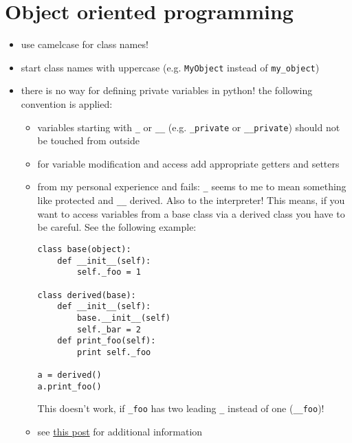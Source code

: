 \documentclass[10pt,a4paper]{scrartcl}
\begin{document}
\section{Object oriented programming}
\begin{itemize}
\item use camelcase for class names!
\item start class names with uppercase (e.g. \verb+MyObject+ instead of \verb+my_object+)
\item there is no way for defining private variables in python! the following convention is applied:
\begin{itemize}
\item variables starting with \verb+_+ or \verb+__+ (e.g. \verb+_private+ or \verb+__private+) should not be touched from outside
\item for variable modification and access add appropriate getters and setters
\item from my personal experience and fails: \verb+_+ seems to me to mean something like protected and \verb+__+ derived. Also to the interpreter! This means, if you want to access variables from a base class via a derived class you have to be careful. See the following example:
\begin{verbatim}
class base(object):    
    def __init__(self):
        self._foo = 1

class derived(base):    
    def __init__(self):
        base.__init__(self)
        self._bar = 2
    def print_foo(self):
        print self._foo

a = derived()
a.print_foo()
\end{verbatim}
This doesn't work, if \verb+_foo+ has two leading \verb+_+ instead of one (\verb+__foo+)!
\item see \href{http://stackoverflow.com/questions/1641219/does-python-have-private-variables-in-classes}{this post} for additional information
\end{itemize}

\end{itemize}
\end{document}

